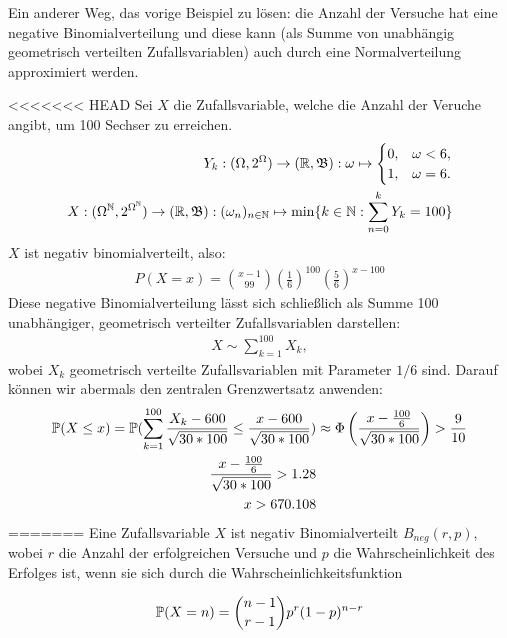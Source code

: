 \begin{exercise}

Ein anderer Weg, das vorige Beispiel zu lösen: die Anzahl der Versuche hat eine negative Binomialverteilung und diese kann (als Summe von unabhängig geometrisch verteilten Zufallsvariablen) auch durch eine Normalverteilung approximiert werden.

\end{exercise}

\begin{solution}

<<<<<<< HEAD
Sei $X$ die Zufallsvariable, welche die Anzahl der Veruche angibt, um 100 Sechser zu erreichen.
\begin{align*}
Y_k:(\Omega,2^\Omega) \to (\R,\B): \omega \mapsto
\begin{cases}
    0, & \omega < 6, \\
    1, & \omega = 6.
\end{cases} \\
    X:(\Omega^\N,2^{\Omega^\N}) \to (\R, \B): (\omega_n)_{n\in\N} \mapsto \min\{k\in\N: \sum_{n = 0}^kY_k = 100\}
\end{align*}
$X$ ist negativ binomialverteilt, also:
\begin{align*}
  P(X=x) = {x - 1\choose 99}(\frac{1}{6})^{100}(\frac{5}{6})^{x-100}
\end{align*}
Diese negative Binomialverteilung lässt sich schließlich als Summe 100 unabhängiger, geometrisch verteilter Zufallsvariablen darstellen:
\begin{align*}
  X \sim \sum_{k=1}^{100}X_k,
\end{align*}
wobei $X_k$ geometrisch verteilte Zufallsvariablen mit Parameter $1/6$ sind.
Darauf können wir abermals den zentralen Grenzwertsatz anwenden:
\begin{align*}
  \P(X \leq x) = \P(\sum_{k=1}^{100}\frac{X_k - 600}{\sqrt{30*100}} \leq \frac{x-600}{\sqrt{30*100}}) &\approx \Phi\pbraces{\frac{x-\frac{100}{6}}{\sqrt{30*100}}}  > \frac{9}{10} \\
  \frac{x-\frac{100}{6}}{\sqrt{30*100}} > 1.28 \\
  x > 670.108
\end{align*}
=======
Eine Zufallsvariable $X$ ist negativ Binomialverteilt $B_{neg} (r,p)$, wobei
$r$ die Anzahl der erfolgreichen Versuche und $p$ die Wahrscheinlichkeit
des Erfolges ist, wenn sie sich durch die Wahrscheinlichkeitsfunktion

\begin{align*}
  \P(X=n) = \binom{n-1}{r-1}p^r(1-p)^{n-r}
\end{align*}


\end{solution}

